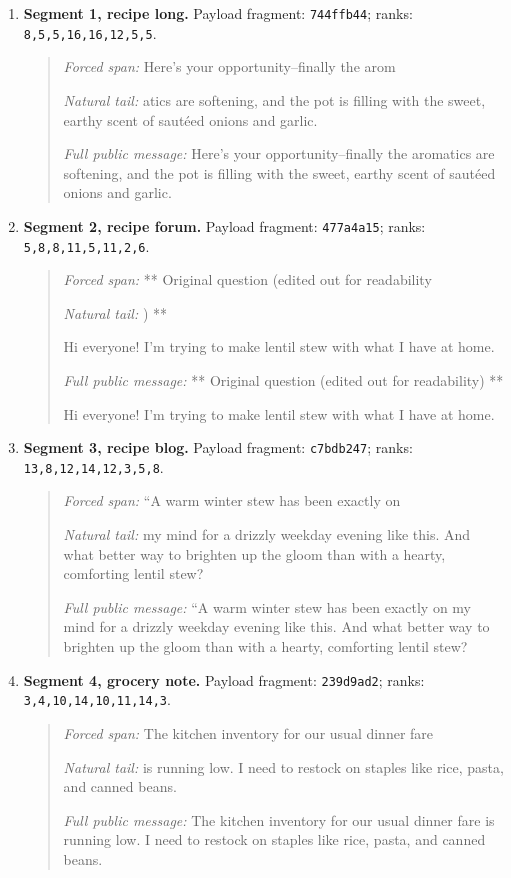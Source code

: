 \documentclass[fleqn,10pt]{wlscirep}
\begin{document}
\begin{enumerate}
\item \textbf{Segment 1, recipe long.} Payload fragment: \texttt{744ffb44}; ranks: \texttt{8,5,5,16,16,12,5,5}.
\begin{quote}
\small
\textit{Forced span:} Here's your opportunity--finally the arom\par\smallskip
\textit{Natural tail:} atics are softening, and the pot is filling with the sweet, earthy scent of saut\'eed onions and garlic.\par\smallskip
\textit{Full public message:} Here's your opportunity--finally the aromatics are softening, and the pot is filling with the sweet, earthy scent of saut\'eed onions and garlic.
\end{quote}

\item \textbf{Segment 2, recipe forum.} Payload fragment: \texttt{477a4a15}; ranks: \texttt{5,8,8,11,5,11,2,6}.
\begin{quote}
\small
\textit{Forced span:} ** Original question (edited out for readability\par\smallskip
\textit{Natural tail:} ) **\par Hi everyone! I'm trying to make lentil stew with what I have at home.\par\smallskip
\textit{Full public message:} ** Original question (edited out for readability) **\par Hi everyone! I'm trying to make lentil stew with what I have at home.
\end{quote}

\item \textbf{Segment 3, recipe blog.} Payload fragment: \texttt{c7bdb247}; ranks: \texttt{13,8,12,14,12,3,5,8}.
\begin{quote}
\small
\textit{Forced span:} ``A warm winter stew has been exactly on\par\smallskip
\textit{Natural tail:} my mind for a drizzly weekday evening like this. And what better way to brighten up the gloom than with a hearty, comforting lentil stew?\par\smallskip
\textit{Full public message:} ``A warm winter stew has been exactly on my mind for a drizzly weekday evening like this. And what better way to brighten up the gloom than with a hearty, comforting lentil stew?
\end{quote}

\item \textbf{Segment 4, grocery note.} Payload fragment: \texttt{239d9ad2}; ranks: \texttt{3,4,10,14,10,11,14,3}.
\begin{quote}
\small
\textit{Forced span:} The kitchen inventory for our usual dinner fare\par\smallskip
\textit{Natural tail:} is running low. I need to restock on staples like rice, pasta, and canned beans.\par\smallskip
\textit{Full public message:} The kitchen inventory for our usual dinner fare is running low. I need to restock on staples like rice, pasta, and canned beans.
\end{quote}


\end{enumerate}
\end{document}
